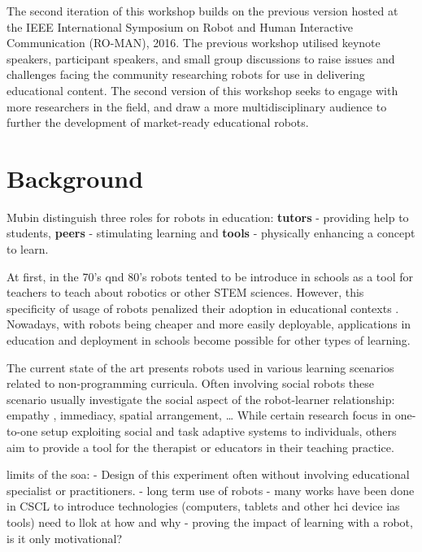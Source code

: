\documentclass{sig-alternate-05-2015}
\begin{document}
The second iteration of this workshop builds on the previous version hosted at 
the IEEE International Symposium on Robot and Human Interactive Communication 
(RO-MAN), 2016. The previous workshop utilised keynote speakers, participant 
speakers, and small group discussions to raise issues and challenges facing the 
community researching robots for use in delivering educational content. The 
second version of this workshop seeks to engage with more researchers in the 
field, and draw a more multidisciplinary audience to further the development of 
market-ready educational robots.

\section{Background}


Mubin \cite{mubin2013review} distinguish three roles for robots in education:
\textbf{tutors} - providing help to students, \textbf{peers} - stimulating learning and \textbf{tools} - physically enhancing a concept to learn.

At first, in the 70's qnd 80's robots tented to be introduce in schools as a tool for teachers to teach about robotics or other STEM sciences. 
However, this specificity of usage of robots penalized their adoption in educational contexts \cite{}. 
Nowadays, with robots being cheaper and more easily deployable, applications in education and deployment in schools become possible for other types of learning.  


The current state of the art presents robots used in various learning scenarios related to non-programming curricula. 
Often involving social robots these scenario usually investigate the social aspect of the robot-learner relationship: empathy \cite{}, immediacy, spatial arrangement\cite{}, \dots
While certain research focus in one-to-one setup \cite{} exploiting social and task adaptive systems to individuals, others aim to provide a tool for the therapist or educators in  their teaching practice\cite{}. 

limits of the soa:
- Design of this experiment often without involving educational specialist or practitioners. 
- long term use of robots
- many works have been done in CSCL to introduce technologies (computers, tablets and other hci device ias tools) need to llok at how and why
- proving the impact of learning with a robot, is it only motivational?
\end{document}

